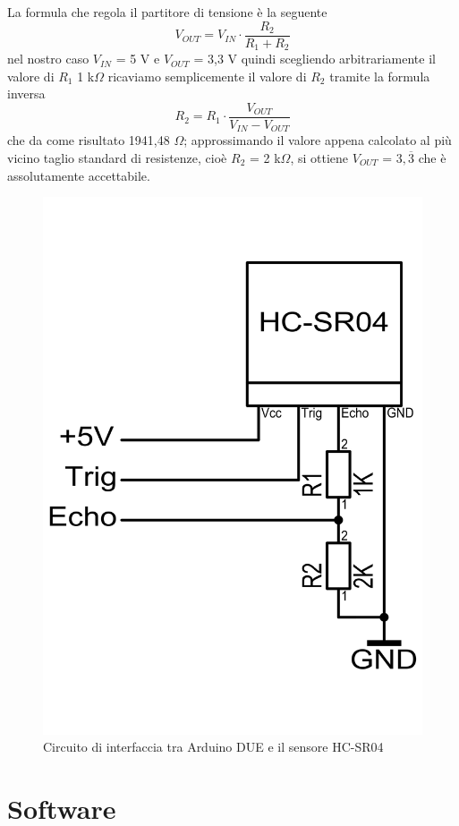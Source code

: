 La formula che regola il partitore di tensione è la seguente
$$V_{OUT}=V_{IN}\cdot\frac{R_2}{R_1+R_2}$$
nel nostro caso $V_{IN}$ = 5 V e $V_{OUT}$ = 3,3 V quindi scegliendo arbitrariamente 
il valore di $R_1$ 1 k$\Omega$ ricaviamo semplicemente il valore di $R_2$ tramite 
la formula inversa $$R_2 = R_1\cdot\frac{V_{OUT}}{V_{IN}-V_{OUT}}$$
che da come risultato 1941,48 $\Omega$; approssimando il valore appena calcolato
al più vicino taglio standard di resistenze, cioè $R_2 $ = 2 k$\Omega$, si ottiene $V_{OUT}$
 = $3,\overline{3}$ che è assolutamente accettabile.

\begin{figure}[H] \center
\includegraphics[scale=0.3]{immagini/HC-SR04_Circuito.png}
\caption{Circuito di interfaccia tra Arduino DUE e il sensore HC-SR04} 
\end{figure}

\section{Software}

